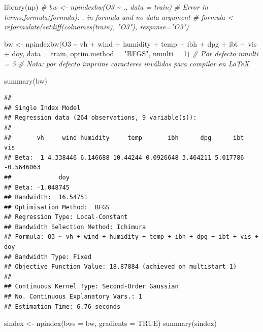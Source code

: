 \documentclass[
  spanish,
]{book}
\newenvironment{Shaded}{\begin{snugshade}}{\end{snugshade}}
\newcommand{\AttributeTok}[1]{\textcolor[rgb]{0.77,0.63,0.00}{#1}}
\newcommand{\CommentTok}[1]{\textcolor[rgb]{0.56,0.35,0.01}{\textit{#1}}}
\newcommand{\ConstantTok}[1]{\textcolor[rgb]{0.00,0.00,0.00}{#1}}
\newcommand{\DecValTok}[1]{\textcolor[rgb]{0.00,0.00,0.81}{#1}}
\newcommand{\FunctionTok}[1]{\textcolor[rgb]{0.00,0.00,0.00}{#1}}
\newcommand{\NormalTok}[1]{#1}
\newcommand{\OtherTok}[1]{\textcolor[rgb]{0.56,0.35,0.01}{#1}}
\newcommand{\SpecialCharTok}[1]{\textcolor[rgb]{0.00,0.00,0.00}{#1}}
\newcommand{\StringTok}[1]{\textcolor[rgb]{0.31,0.60,0.02}{#1}}
\theoremstyle{break}
\theoremstyle{definition}
\theoremstyle{definition}
\theoremstyle{definition}
\theoremstyle{definition}
\theoremstyle{remark}
\begin{document}
\begin{Shaded}
\begin{Highlighting}[]
\FunctionTok{library}\NormalTok{(np)}
\CommentTok{\# bw \textless{}{-} npindexbw(O3 \textasciitilde{} ., data = train)}
\CommentTok{\# Error in terms.formula(formula): \textquotesingle{}.\textquotesingle{} in formula and no \textquotesingle{}data\textquotesingle{} argument}
\CommentTok{\# formula \textless{}{-} reformulate(setdiff(colnames(train), "O3"), response="O3")}

\NormalTok{bw }\OtherTok{\textless{}{-}} \FunctionTok{npindexbw}\NormalTok{(O3 }\SpecialCharTok{\textasciitilde{}}\NormalTok{ vh }\SpecialCharTok{+}\NormalTok{ wind }\SpecialCharTok{+}\NormalTok{ humidity }\SpecialCharTok{+}\NormalTok{ temp }\SpecialCharTok{+}\NormalTok{ ibh }\SpecialCharTok{+}\NormalTok{ dpg }\SpecialCharTok{+}\NormalTok{ ibt }\SpecialCharTok{+}\NormalTok{ vis }\SpecialCharTok{+}\NormalTok{ doy,}
                \AttributeTok{data =}\NormalTok{ train, }\AttributeTok{optim.method =} \StringTok{"BFGS"}\NormalTok{, }\AttributeTok{nmulti =} \DecValTok{1}\NormalTok{) }\CommentTok{\# Por defecto nmulti = 5}
\CommentTok{\# Nota: por defecto imprime caracteres inválidos para compilar en LaTeX}
\end{Highlighting}
\end{Shaded}

\begin{Shaded}
\begin{Highlighting}[]
\FunctionTok{summary}\NormalTok{(bw)}
\end{Highlighting}
\end{Shaded}

\begin{verbatim}
## 
## Single Index Model
## Regression data (264 observations, 9 variable(s)):
## 
##       vh     wind humidity     temp       ibh      dpg      ibt        vis
## Beta:  1 4.338446 6.146688 10.44244 0.0926648 3.464211 5.017786 -0.5646063
##             doy
## Beta: -1.048745
## Bandwidth:  16.54751
## Optimisation Method:  BFGS
## Regression Type: Local-Constant
## Bandwidth Selection Method: Ichimura
## Formula: O3 ~ vh + wind + humidity + temp + ibh + dpg + ibt + vis + doy
## Bandwidth Type: Fixed
## Objective Function Value: 18.87884 (achieved on multistart 1)
## 
## Continuous Kernel Type: Second-Order Gaussian
## No. Continuous Explanatory Vars.: 1
## Estimation Time: 6.76 seconds
\end{verbatim}

\begin{Shaded}
\begin{Highlighting}[]
\NormalTok{sindex }\OtherTok{\textless{}{-}} \FunctionTok{npindex}\NormalTok{(}\AttributeTok{bws =}\NormalTok{ bw, }\AttributeTok{gradients =} \ConstantTok{TRUE}\NormalTok{)}
\FunctionTok{summary}\NormalTok{(sindex)}
\end{Highlighting}
\end{Shaded}
\end{document}
